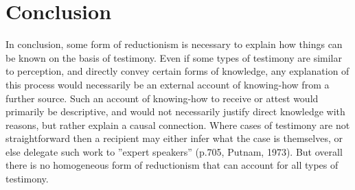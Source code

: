 \documentclass[a4paper, 11pt]{article} %
\begin{document}
\section*{Conclusion}

In conclusion, some form of reductionism is necessary to explain how things can be known on the basis of testimony. Even if some types of testimony are similar to perception, and directly convey certain forms of knowledge, any explanation of this process would necessarily be an external account of knowing-how from a further source. Such an account of knowing-how to receive or attest would primarily be descriptive, and would not necessarily justify direct knowledge with reasons, but rather explain a causal connection. Where cases of testimony are not straightforward then a recipient may either infer what the case is themselves, or else delegate such work to ''expert speakers'' (p.705, Putnam, 1973). But overall there is no homogeneous form of reductionism that can account for all types of testimony. 






\end{document}
